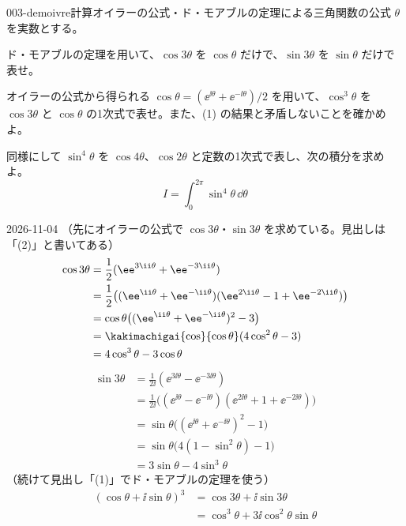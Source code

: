 \documentclass[uplatex,dvipdfmx,a4paper,11pt]{jsarticle}
\begin{document}
\begin{mondai}{003-demoivre}{計算}{オイラーの公式・ド・モアブルの定理による三角関数の公式}
$\theta$ を実数とする。
  \begin{shoumon}
    \item ド・モアブルの定理を用いて、$\cos 3\theta$ を $\cos\theta$ だけで、$\sin 3\theta$ を $\sin\theta$ だけで表せ。
    \item オイラーの公式から得られる $\cos\theta=(\ee^{\ii\theta}+\ee^{-\ii\theta})/2$ を用いて、$\cos^{3}\theta$ を $\cos 3\theta$ と $\cos\theta$ の1次式で表せ。また、(1) の結果と矛盾しないことを確かめよ。
    \item 同様にして $\sin^{4}\theta$ を $\cos 4\theta$、$\cos 2\theta$ と定数の1次式で表し、次の積分を求めよ。
    \[ I=\int_{0}^{2\pi}\sin^{4}\theta\,\dd\theta \]
  \end{shoumon}
\begin{kotaeutsushi}{2026-11-04}
（先にオイラーの公式で $\cos3\theta$・$\sin3\theta$ を求めている。見出しは「(2)」と書いてある）
\begin{align*}
\cos3\theta&=\frac{1}{2}(\ee^{3\ii\theta}+\ee^{-3\ii\theta})\\
&=\frac{1}{2}\bigl((\ee^{\ii\theta}+\ee^{-\ii\theta})(\ee^{2\ii\theta}-1+\ee^{-2\ii\theta})\bigr)\\
&=\cos\theta\bigl((\ee^{\ii\theta}+\ee^{-\ii\theta})^{2}-3\bigr)\\
&=\kakimachigai{\cos}{\cos\theta}(4\cos^{2}\theta-3)\\
&=4\cos^{3}\theta-3\cos\theta
\end{align*}
\begin{align*}
\sin3\theta&=\frac{1}{2\ii}(\ee^{3\ii\theta}-\ee^{-3\ii\theta})\\
&=\frac{1}{2\ii}\bigl((\ee^{\ii\theta}-\ee^{-\ii\theta})(\ee^{2\ii\theta}+1+\ee^{-2\ii\theta})\bigr)\\
&=\sin\theta\bigl((\ee^{\ii\theta}+\ee^{-\ii\theta})^{2}-1\bigr)\\
&=\sin\theta\bigl(4(1-\sin^{2}\theta)-1\bigr)\\
&=3\sin\theta-4\sin^{3}\theta
\end{align*}
（続けて見出し「(1)」でド・モアブルの定理を使う）
\begin{align*}
(\cos\theta+\ii\sin\theta)^{3}&=\cos3\theta+\ii\sin3\theta\\
&=\cos^{3}\theta+3\ii\cos^{2}\theta\sin\theta\\

\end{align*}
\end{kotaeutsushi}
\end{mondai}
\end{document}
